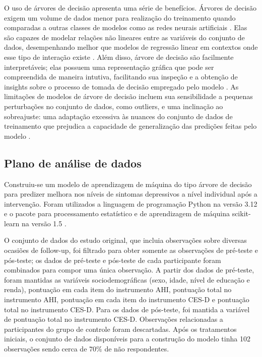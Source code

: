 O uso de árvores de decisão apresenta uma série de benefícios. Árvores de decisão exigem um volume de dados menor para realização do treinamento quando comparadas a outras classes
de modelos como as redes neurais artificiais \cite{Theobald2021}. Elas são capazes de modelar relações não lineares entre as variáveis do conjunto de dados, desempenhando melhor
que modelos de regressão linear em contextos onde esse tipo de interação existe \cite{Bi2019}. Além disso, árvore de decisão são facilmente interpretáveis; elas possuem uma representação
gráfica que pode ser compreendida de maneira intutiva, facilitando sua inspeção e a obtenção de insights sobre o processo de tomada de decisão empregado pelo modelo \cite{Bi2019}.
As limitações de modelos de árvore de decisão incluem sua sensibilidade a pequenas perturbações no conjunto de dados, como outliers, e uma inclinação ao sobreajuste: uma adaptação
excessiva às nuances do conjunto de dados de treinamento que prejudica a capacidade de generalização das predições feitas pelo modelo \cite{Bi2019}.

\subsection{Plano de análise de dados}

Construiu-se um modelo de aprendizagem de máquina do tipo árvore de decisão para predizer melhora nos níveis de sintomas depressivos a nível individual após a intervenção.
Foram utilizados a linguagem de programação Python na versão 3.12 \cite{Python} e o pacote para processamento estatístico e de aprendizagem de máquina scikit-learn na versão
1.5 \cite{ScikitLearn}.

O conjunto de dados do estudo original, que incluia observações sobre diversas ocasiões de follow-up, foi filtrado para obter somente as observações de pré-teste e pós-teste; os dados de
pré-teste e pós-teste de cada participante foram combinados para compor uma única observação. A partir dos dados de pré-teste, foram mantidas as variáveis sociodemográficas (sexo, idade,
nível de educação e renda), pontuação em cada item do instrumento AHI, pontuação total no instrumento AHI, pontuação em cada item do instrumento CES-D e pontuação total no instrumento CES-D.
Para os dados de pós-teste, foi mantida a variável de pontuação total no instrumento CES-D. Observações relacionadas a participantes do grupo de controle foram descartadas. Após os tratamentos
iniciais, o conjunto de dados disponíveis para a construção do modelo tinha 102 observações sendo cerca de $70\%$ de não respondentes.

